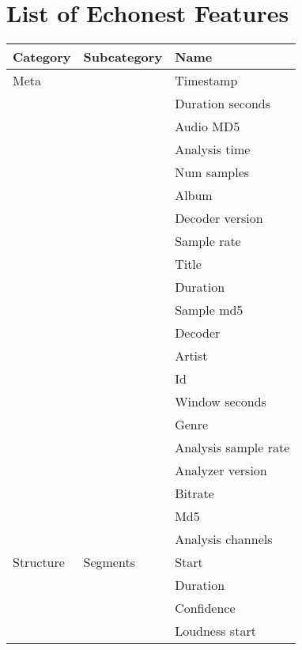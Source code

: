 \chapter{List of Echonest Features} 

\label{AppendixB} 


\begin{center}
\begin{longtable}{ p{} p{} p{} } 

\textbf{Category} & \textbf{Subcategory} & \textbf{Name} \\ \toprule
Meta & & Timestamp  \\ \cmidrule(r){3-3}
& & Duration seconds \\ \cmidrule(r){3-3}
& & Audio MD5 \\ \cmidrule(r){3-3}
& & Analysis time \\ \cmidrule(r){3-3}
& & Num samples \\ \cmidrule(r){3-3}
& & Album \\ \cmidrule(r){3-3}
& & Decoder version \\ \cmidrule(r){3-3}
& & Sample rate \\ \cmidrule(r){3-3}
& & Title \\ \cmidrule(r){3-3}
& & Duration \\ \cmidrule(r){3-3}
& & Sample md5 \\ \cmidrule(r){3-3}
& & Decoder \\ \cmidrule(r){3-3}
& & Artist \\ \cmidrule(r){3-3}
& & Id \\ \cmidrule(r){3-3}
& & Window seconds \\ \cmidrule(r){3-3}
& & Genre \\ \cmidrule(r){3-3}
& & Analysis sample rate \\ \cmidrule(r){3-3}
& & Analyzer version \\ \cmidrule(r){3-3}
& & Bitrate \\ \cmidrule(r){3-3}
& & Md5 \\ \cmidrule(r){3-3}
& & Analysis channels \\ \hline
Structure & Segments & Start \\ \cmidrule(r){3-3}
& & Duration \\ \cmidrule(r){3-3}
& & Confidence \\ \cmidrule(r){3-3}
& & Loudness start \\ \cmidrule(r){3-3}

\end{longtable}
\end{center}

